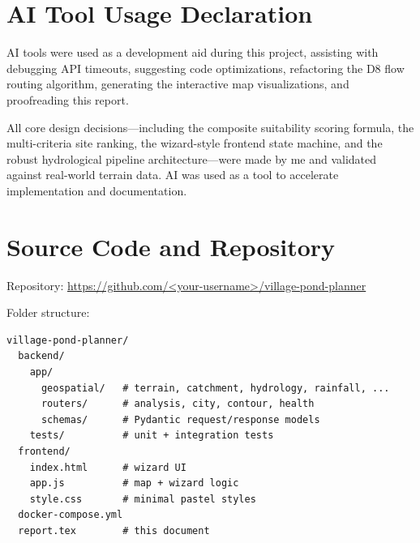 \documentclass[manuscript,screen,review]{acmart}
\begin{document}
\section{AI Tool Usage Declaration}
\label{sec:ai-usage}

AI tools were used as a development aid during this project, assisting with debugging API timeouts, suggesting code optimizations, refactoring the D8 flow routing algorithm, generating the interactive map visualizations, and proofreading this report.

All core design decisions---including the composite suitability scoring formula, the multi-criteria site ranking, the wizard-style frontend state machine, and the robust hydrological pipeline architecture---were made by me and validated against real-world terrain data. AI was used as a tool to accelerate implementation and documentation.

\appendix

\section{Source Code and Repository}
\label{sec:repo}

Repository: \url{https://github.com/<your-username>/village-pond-planner}

\noindent Folder structure:
\begin{verbatim}
village-pond-planner/
  backend/
    app/
      geospatial/   # terrain, catchment, hydrology, rainfall, ...
      routers/      # analysis, city, contour, health
      schemas/      # Pydantic request/response models
    tests/          # unit + integration tests
  frontend/
    index.html      # wizard UI
    app.js          # map + wizard logic
    style.css       # minimal pastel styles
  docker-compose.yml
  report.tex        # this document
\end{verbatim}
\end{document}
